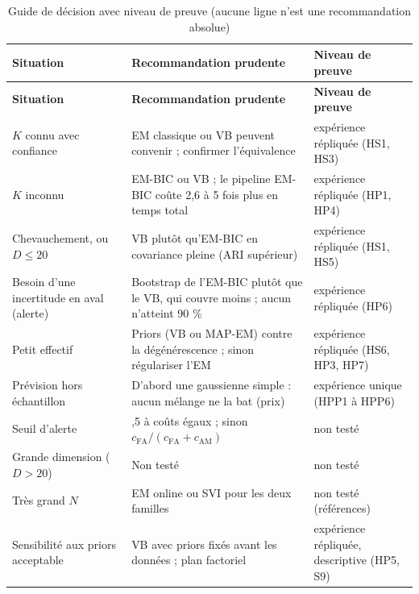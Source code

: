 {\scriptsize
\setlength{\tabcolsep}{3pt}
\begin{longtable}{>{\raggedright\arraybackslash}p{4.30cm}>{\raggedright\arraybackslash}p{7.20cm}>{\raggedright\arraybackslash}p{3.80cm}}
\caption{Guide de décision avec niveau de preuve (aucune ligne n'est une recommandation absolue)}\label{tab:3_4}\\
\toprule
\textbf{Situation} & \textbf{Recommandation prudente} & \textbf{Niveau de preuve} \\
\midrule
\endfirsthead
\toprule
\textbf{Situation} & \textbf{Recommandation prudente} & \textbf{Niveau de preuve} \\
\midrule
\endhead
\bottomrule
\endfoot
$K$ connu avec confiance & EM classique ou VB peuvent convenir ; confirmer l'équivalence & expérience répliquée (HS1, HS3) \\
$K$ inconnu & EM-BIC ou VB ; le pipeline EM-BIC coûte 2,6 à 5 fois plus en temps total & expérience répliquée (HP1, HP4) \\
Chevauchement, ou $D \leq 20$ & VB plutôt qu'EM-BIC en covariance pleine (ARI supérieur) & expérience répliquée (HS1, HS5) \\
Besoin d'une incertitude en aval (alerte) & Bootstrap de l'EM-BIC plutôt que le VB, qui couvre moins ; aucun n'atteint 90 \% & expérience répliquée (HP6) \\
Petit effectif & Priors (VB ou MAP-EM) contre la dégénérescence ; sinon régulariser l'EM & expérience répliquée (HS6, HP3, HP7) \\
Prévision hors échantillon & D'abord une gaussienne simple : aucun mélange ne la bat (prix) & expérience unique (HPP1 à HPP6) \\
Seuil d'alerte & 0,5 à coûts égaux ; sinon $c_{\text{FA}}/(c_{\text{FA}} + c_{\text{AM}})$ & non testé \\
Grande dimension ($D>20$) & Non testé & non testé \\
Très grand $N$ & EM online ou SVI pour les deux familles & non testé (références) \\
Sensibilité aux priors acceptable & VB avec priors fixés avant les données ; plan factoriel & expérience répliquée, descriptive (HP5, S9) \\
\end{longtable}
}
